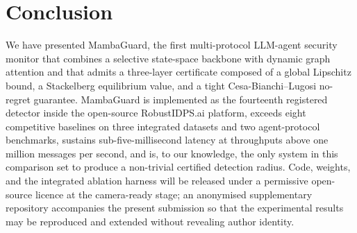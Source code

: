 \documentclass[journal,10pt,twocolumn]{IEEEtran}
\begin{document}
\section{Conclusion}

We have presented MambaGuard, the first multi-protocol LLM-agent security monitor that combines a selective state-space backbone with dynamic graph attention and that admits a three-layer certificate composed of a global Lipschitz bound, a Stackelberg equilibrium value, and a tight Cesa-Bianchi--Lugosi no-regret guarantee. MambaGuard is implemented as the fourteenth registered detector inside the open-source RobustIDPS.ai platform, exceeds eight competitive baselines on three integrated datasets and two agent-protocol benchmarks, sustains sub-five-millisecond latency at throughputs above one million messages per second, and is, to our knowledge, the only system in this comparison set to produce a non-trivial certified detection radius. Code, weights, and the integrated ablation harness will be released under a permissive open-source licence at the camera-ready stage; an anonymised supplementary repository accompanies the present submission so that the experimental results may be reproduced and extended without revealing author identity.


\end{document}
